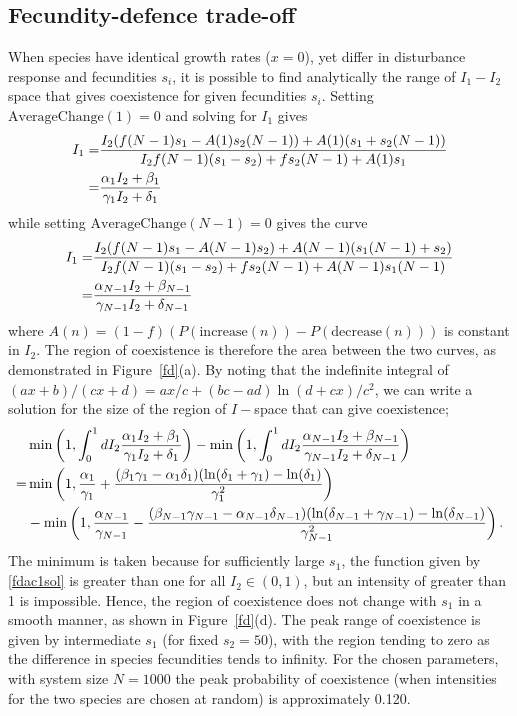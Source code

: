 \documentclass[preprint,10pt,reqno]{amsart}
\begin{document}
\subsection{Fecundity-defence trade-off}
When species have identical growth rates ($x=0$), yet differ in disturbance response and fecundities $s_i$, it is possible to find analytically the range of $I_1 - I_2$ space that gives coexistence for given fecundities $s_i$. Setting $\text{AverageChange}(1)=0$ and solving for $I_1$ gives
\begin{align}
\label{fdac1sol}
I_1=&\frac{I_2(f(N-1)s_1-A(1)s_2(N-1)) +A(1)(s_1+s_2(N-1))}{I_2f(N-1)(s_1-s_2) +fs_2(N-1) +A(1)s_1}\notag \\
=&\frac{\alpha_1 I_2 +\beta_1}{\gamma_1 I_2+\delta_1}
\end{align}
while setting $\text{AverageChange}(N-1)=0$ gives the curve
\begin{align}
\label{fdacnsol}
I_1=&\frac{I_2(f(N-1)s_1-A(N-1)s_2) +A(N-1)(s_1(N-1)+s_2)}{I_2f(N-1)(s_1-s_2) +fs_2(N-1) +A(N-1)s_1(N-1)}\notag \\
=&\frac{\alpha_{N-1} I_2 +\beta_{N-1}}{\gamma_{N-1} I_2+\delta_{N-1}}
\end{align}
where $A(n)=(1-f)(P(\text{increase}(n))-P(\text{decrease}(n)))$ is constant in $I_2$. The region of coexistence is therefore the area between the two curves, as demonstrated in Figure~\ref{fd}(a). By noting that the indefinite integral of $(a x +b)/(c x +d) = ax/c+(bc-ad)\ln(d+cx)/c^2$, we can write a solution for the size of the region of $I-$space that can give coexistence;
\begin{align}
&\min \left(1, \int_0^1 dI_2 \frac{\alpha_1 I_2 +\beta_1}{\gamma_1 I_2+\delta_1} \right) - \min \left(1, \int_0^1 dI_2 \frac{\alpha_{N-1} I_2 +\beta_{N-1}}{\gamma_{N-1} I_2+\delta_{N-1}} \right) \notag \\
=&\min\left(1,\frac{\alpha_1}{\gamma_1}+\frac{(\beta_1 \gamma_1 - \alpha_1 \delta_1)(\ln(\delta_1 +\gamma_1)-\ln(\delta_1)}{\gamma_1^2}\right) \\
&-\min \left(1,\frac{\alpha_{N-1}}{\gamma_{N-1}}-\frac{(\beta_{N-1} \gamma_{N-1} - \alpha_{N-1} \delta_{N-1})(\ln(\delta_{N-1} +\gamma_{N-1})-\ln(\delta_{N-1})}{\gamma_{N-1}^2}\right). \notag
\end{align}
The minimum is taken because for sufficiently large $s_1$, the function given by \eqref{fdac1sol} is greater than one for all $I_2 \in (0,1)$, but an intensity of greater than 1 is impossible. Hence, the region of coexistence does not change with $s_1$ in a smooth manner, as shown in Figure~\ref{fd}(d). The peak range of coexistence is given by intermediate $s_1$ (for fixed $s_2=50$), with the region tending to zero as the difference in species fecundities tends to infinity. For the chosen parameters, with system size $N=1000$ the peak probability of coexistence (when intensities for the two species are chosen at random) is approximately 0.120.
\end{document}
